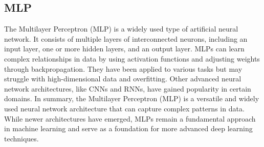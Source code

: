 \subsection{MLP}
The Multilayer Perceptron (MLP) is a widely used type of artificial neural network. It consists of multiple layers of interconnected neurons, including an input layer, one or more hidden layers, and an output layer. MLPs can learn complex relationships in data by using activation functions and adjusting weights through backpropagation. They have been applied to various tasks but may struggle with high-dimensional data and overfitting. Other advanced neural network architectures, like CNNs and RNNs, have gained popularity in certain domains. In summary, the Multilayer Perceptron (MLP) is a versatile and widely used neural network architecture that can capture complex patterns in data. While newer architectures have emerged, MLPs remain a fundamental approach in machine learning and serve as a foundation for more advanced deep learning techniques.

